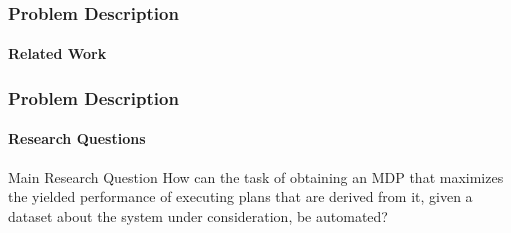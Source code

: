 \begin{frame}
\frametitle{Problem Description}
\framesubtitle{Related Work}



\end{frame}

\begin{frame}
\frametitle{Problem Description}
\framesubtitle{Research Questions}

\begin{block}{Main Research Question}
How can the task of obtaining an MDP that maximizes the yielded performance of executing plans that are derived from it, given a dataset about the system under consideration, be automated? %
\end{block}

\end{frame}